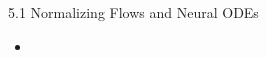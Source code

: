 \begin{frame}{5.1 Normalizing Flows and Neural ODEs}
    \begin{itemize}
        \item
    \end{itemize}
\end{frame}
